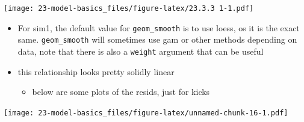 \documentclass[]{book}
\newenvironment{Shaded}{\begin{snugshade}}{\end{snugshade}}
\newcommand{\CommentTok}[1]{\textcolor[rgb]{0.56,0.35,0.01}{\textit{#1}}}
\newcommand{\DataTypeTok}[1]{\textcolor[rgb]{0.13,0.29,0.53}{#1}}
\newcommand{\DecValTok}[1]{\textcolor[rgb]{0.00,0.00,0.81}{#1}}
\newcommand{\KeywordTok}[1]{\textcolor[rgb]{0.13,0.29,0.53}{\textbf{#1}}}
\newcommand{\NormalTok}[1]{#1}
\newcommand{\OperatorTok}[1]{\textcolor[rgb]{0.81,0.36,0.00}{\textbf{#1}}}
\newcommand{\StringTok}[1]{\textcolor[rgb]{0.31,0.60,0.02}{#1}}
\providecommand{\tightlist}{%
  \setlength{\itemsep}{0pt}\setlength{\parskip}{0pt}}
\theoremstyle{definition}
\theoremstyle{definition}
\theoremstyle{definition}
\theoremstyle{remark}
\begin{document}
\begin{enumerate}
  \texttt{[image: 23-model-basics\_files/figure-latex/23.3.3 1-1.pdf]}

  \begin{itemize}
  \tightlist
  \item
    For sim1, the default value for \texttt{geom\_smooth} is to use
    loess, os it is the exact same. \texttt{geom\_smooth} will sometimes
    use gam or other methods depending on data, note that there is also
    a \texttt{weight} argument that can be useful
  \item
    this relationship looks pretty solidly linear

    \begin{itemize}
    \tightlist
    \item
      below are some plots of the resids, just for kicks
    \end{itemize}
  \end{itemize}

\begin{Shaded}
\end{Shaded}

  \texttt{[image: 23-model-basics\_files/figure-latex/unnamed-chunk-16-1.pdf]}


\end{enumerate}
\end{document}
